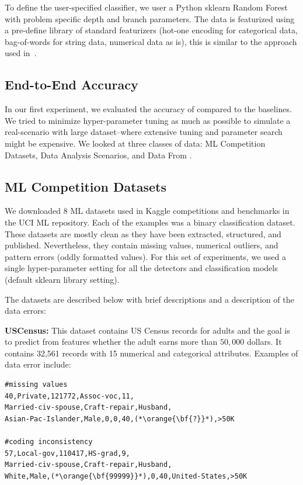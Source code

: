 To define the user-specified classifier, we user a Python \textsf{sklearn} Random Forest with problem specific depth and branch parameters.
The data is featurized using a pre-define library of standard featurizers (hot-one encoding for categorical data, bag-of-words for string data, numerical data as is), this is similar to the approach used in~\cite{DBLP:conf/sigmod/GokhaleDDNRSZ14}.

\subsection{End-to-End Accuracy}
In our first experiment, we evaluated the accuracy of \sys compared to the baselines.
We tried to minimize hyper-parameter tuning as much as possible to simulate a real-scenario with large dataset--where extensive tuning and parameter search might be expensive.
We looked at three classes of data: ML Competition Datasets, Data Analysis Scenarios, and Data From \company.

\subsection{ML Competition Datasets}
We downloaded 8 ML datasets used in Kaggle competitions and benchmarks in the UCI ML repository. 
Each of the examples was a binary classification dataset.
These datasets are mostly clean as they have been extracted, structured, and published.
Nevertheless, they contain missing values, numerical outliers, and pattern errors (oddly formatted values).
For this set of experiments, we used a single hyper-parameter setting for all the detectors and classification models (default \textsf{sklearn} library setting).

The datasets are described below with brief descriptions and a description of the data errors:

\vspace{0.5em}\noindent\textbf{USCensus: } This dataset contains US Census records for adults and the goal is to predict from features whether the adult earns more than $50,000$ dollars. It contains 32,561 records with 15 numerical and categorical attributes. Examples of data error include:
\begin{lstlisting}
#missing values
40,Private,121772,Assoc-voc,11,
Married-civ-spouse,Craft-repair,Husband, 
Asian-Pac-Islander,Male,0,0,40,(*\orange{\bf{?}}*),>50K

#coding inconsistency
57,Local-gov,110417,HS-grad,9,
Married-civ-spouse,Craft-repair,Husband,
White,Male,(*\orange{\bf{99999}}*),0,40,United-States,>50K
\end{lstlisting}


